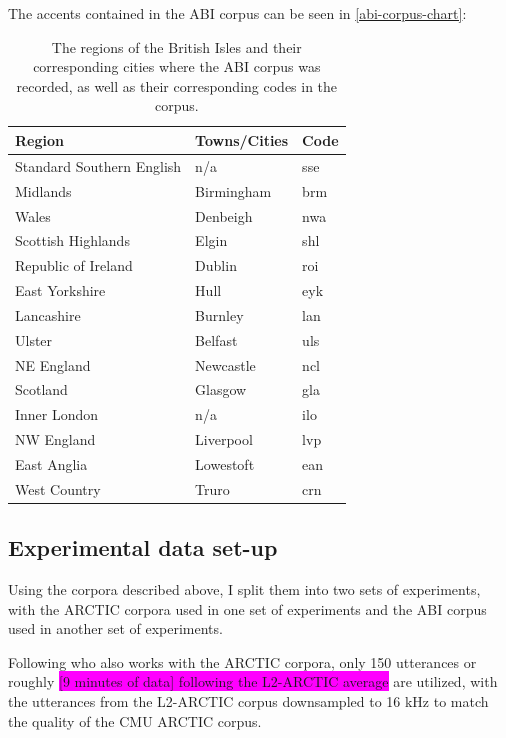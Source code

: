 \documentclass
[
    a4paper,
    twoside,
    12pt,
]
{report}
\begin{document}
The accents contained in the ABI corpus can be seen in
\autoref{abi-corpus-chart}:

\begin{table}[H]
\centering
\begin{tabular}{|l|l|l|}
\hline
\textbf{Region} & \textbf{Towns/Cities} & \textbf{Code} \\ \hline
Standard Southern English & n/a & sse \\ \hline
Midlands & Birmingham & brm \\ \hline
Wales & Denbeigh & nwa \\ \hline
Scottish Highlands & Elgin & shl \\ \hline
Republic of Ireland & Dublin & roi \\ \hline
East Yorkshire & Hull & eyk \\ \hline
Lancashire & Burnley & lan \\ \hline
Ulster & Belfast & uls \\ \hline
NE England & Newcastle & ncl \\ \hline
Scotland & Glasgow & gla \\ \hline
Inner London & n/a & ilo \\ \hline
NW England & Liverpool & lvp \\ \hline
East Anglia & Lowestoft & ean \\ \hline
West Country & Truro & crn \\ \hline
\end{tabular}
\caption{The regions of the British Isles and their corresponding cities where the ABI corpus was recorded, as well as their corresponding codes in the corpus.}
\label{abi-corpus-chart}
\end{table}

\hypertarget{experimental-data-set-up}{%
\subsection{Experimental data set-up}\label{experimental-data-set-up}}

Using the corpora described above, I split them into two sets of
experiments, with the ARCTIC corpora used in one set of experiments and
the ABI corpus used in another set of experiments.

Following \textcite{zhao2018a} who also works with the ARCTIC corpora,
only 150 utterances or roughly
\colorbox{magenta}{[9 minutes of data] following the L2-ARCTIC average}
are utilized, with the utterances from the L2-ARCTIC corpus downsampled
to 16 kHz to match the quality of the CMU ARCTIC corpus.
\end{document}
